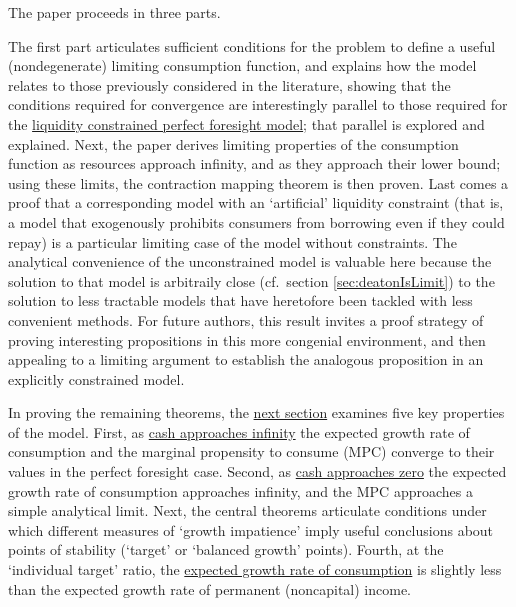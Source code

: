 \documentclass[BufferStockTheory]{subfiles}
\begin{document}

The paper proceeds in three parts.

The first part articulates sufficient conditions for the problem to define a useful (nondegenerate) limiting consumption function, and explains how the model relates to those previously considered in the literature, showing that the conditions required for convergence are interestingly parallel to those required for the \hyperlink{Factors-Defined-And-Compared}{liquidity constrained perfect foresight model}; that parallel is explored and explained.  Next, the paper derives limiting properties of the consumption function as resources approach infinity, and as they approach their lower bound; using these limits, the contraction mapping theorem is then proven.  Last comes a proof that a corresponding model with an `artificial' liquidity constraint (that is, a model that exogenously prohibits consumers from borrowing even if they could repay) is a particular limiting case of the model without constraints.  The analytical convenience of the unconstrained model is valuable here because the solution to that model is arbitraily close (cf.\ section \ref{sec:deatonIsLimit}) to the solution to less tractable models that have heretofore been tackled with less convenient methods.  For future authors, this result invites a proof strategy of proving interesting propositions in this more congenial environment, and then appealing to a limiting argument to establish the analogous proposition in an explicitly constrained model.%
  
In proving the remaining theorems, the \hyperlink{AnalysisoftheConvergedConsumptionFunction}{next section} examines five key properties of the model. First, as \hyperlink{LimitsAsmtToInfty}{cash approaches infinity} the expected growth rate of consumption and the marginal propensity to consume (MPC) converge to their values in the perfect foresight case. Second, as \hyperlink{LimitsAsmtToZero}{cash approaches zero} the expected growth rate of consumption approaches infinity, and the MPC approaches a simple analytical limit.  Next, the central theorems articulate conditions under which different measures of `growth impatience' imply useful conclusions about points of stability (`target' or `balanced growth' points).  Fourth, at the `individual target' ratio, the \hyperlink{cGroLTpGro}{expected growth rate of consumption} is slightly less than the expected growth rate of permanent (noncapital) income.  %
\end{document}
